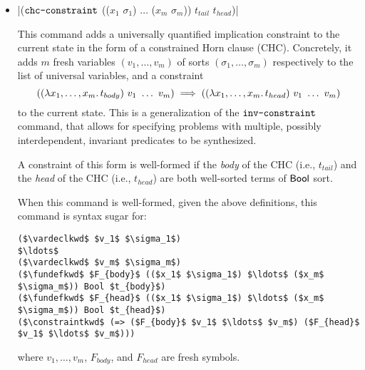 \documentclass[english,a4paper,10pt]{article}
\begin{document}
\begin{itemize}
When this command is well-formed, given the above definitions,
this command is syntax sugar for:
\begin{lstlisting}[language=SyGuS, numbers=none, basicstyle=\ttfamily\small]
($\vardeclkwd$ $v_1$ $\sigma_1$)
($\vardeclkwd$ $v'_1$ $\sigma_1$)
$\ldots$
($\vardeclkwd$ $v_n$ $\sigma_n$)
($\vardeclkwd$ $v'_n$ $\sigma_n$)
($\constraintkwd$ (=> ($S_{pre}$ $v_1$ $\ldots$ $v_n$) ($S$ $v_1$ $\ldots$ $v_n$)))
($\constraintkwd$ (=> (and ($S$ $v_1$ $\ldots$ $v_n$) ($S_{trans}$ $v_1$ $\ldots$ $v_n$ $v'_1$ $\ldots$ $v'_n$)) ($S$ $v'_1$ $\ldots$ $v'_n$)))
($\constraintkwd$ (=> ($S$ $v_1$ $\ldots$ $v_n$) ($S_{post}$ $v_1$ $\ldots$ $v_n$)))
\end{lstlisting}
where $v_1, v'_1, \ldots, v_n, v'_n$ are fresh symbols.

\item \code|($\texttt{chc-constraint}$ (($x_1$ $\sigma_1$) $\ldots$ ($x_m$ $\sigma_m$)) $t_{tail}$ $t_{head}$)|

This command adds a universally quantified implication constraint to the current state
in the form of a constrained Horn clause (CHC).
Concretely, it adds $m$ fresh variables $(v_1, \ldots, v_m)$ of sorts $(\sigma_1, \ldots, \sigma_m)$ respectively
to the list of universal variables,
and a constraint
$$
  ((\lambda x_1,\ldots,x_m \ldotp t_{body})\ v_1\ \ldots\ v_m) \implies ((\lambda x_1,\ldots,x_m \ldotp t_{head})\ v_1\ \ldots\ v_m)
$$
to the current state.
This is a generalization of the $\texttt{inv-constraint}$ command,
that allows for specifying problems with multiple, possibly interdependent,
invariant predicates to be synthesized.

A constraint of this form is well-formed if
the \emph{body} of the CHC (i.e., $t_{tail}$) and the \emph{head} of the CHC (i.e., $t_{head}$)
are both well-sorted terms of $\mathsf{Bool}$ sort.

When this command is well-formed, given the above definitions,
this command is syntax sugar for:
\begin{lstlisting}[language=SyGuS, numbers=none, basicstyle=\ttfamily\small]
($\vardeclkwd$ $v_1$ $\sigma_1$)
$\ldots$
($\vardeclkwd$ $v_m$ $\sigma_m$)
($\fundefkwd$ $F_{body}$ (($x_1$ $\sigma_1$) $\ldots$ ($x_m$ $\sigma_m$)) Bool $t_{body}$)
($\fundefkwd$ $F_{head}$ (($x_1$ $\sigma_1$) $\ldots$ ($x_m$ $\sigma_m$)) Bool $t_{head}$)
($\constraintkwd$ (=> ($F_{body}$ $v_1$ $\ldots$ $v_m$) ($F_{head}$ $v_1$ $\ldots$ $v_m$)))
\end{lstlisting}
where $v_1, \ldots, v_m$, $F_{body}$, and $F_{head}$ are fresh symbols.

\end{itemize}
\end{document}
